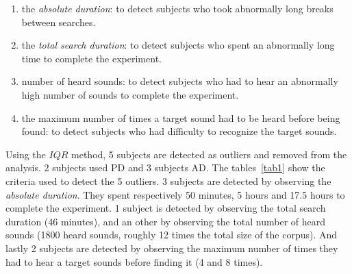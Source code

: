 \documentclass{aes2e}
\begin{document}
\begin{enumerate}
\item the \textit{absolute duration}: to detect subjects who took abnormally long breaks between searches.
\item the \textit{total search duration}: to detect subjects who spent an abnormally long time to complete the experiment.
\item number of heard sounds: to detect subjects who had to hear an abnormally high number of sounds to complete the experiment.
\item the maximum number of times a target sound had to be heard before being found: to detect subjects who had difficulty to recognize the target sounds.
\end{enumerate}

Using the $IQR$ method, 5 subjects are detected as outliers and removed from the analysis. 2 subjects used PD and 3 subjects AD. The tables~\ref{tab1} show the criteria used to detect the 5 outliers. 3 subjects are detected by observing the \textit{absolute duration}. They spent respectively 50 minutes, 5 hours and 17.5 hours to complete the experiment. 1 subject is detected by observing the total search duration (46 minutes), and an other by observing the total number of heard sounds (1800 heard sounds, roughly 12 times the total size of the corpus). And lastly 2 subjects are detected by observing the maximum number of times they had to hear a target sounds before finding it (4 and 8 times).
\end{document}
